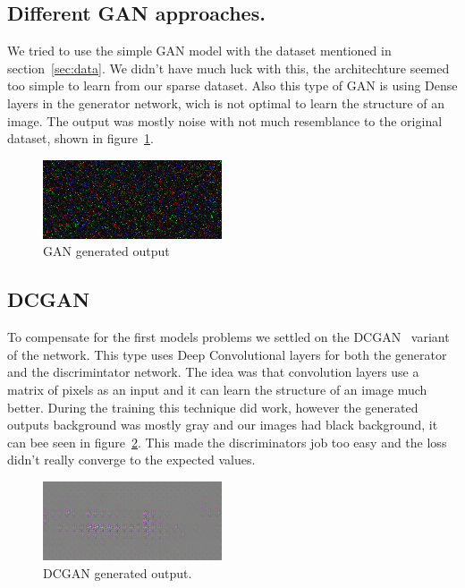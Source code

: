\documentclass{article}
\begin{document}
\subsection{Different GAN approaches.}
We tried to use the simple GAN model with the dataset mentioned in section~\ref{sec:data}. We didn't have much luck with this, the architechture seemed too simple to learn from our sparse dataset. Also this type of GAN is using Dense layers in the generator network, wich is not optimal to learn the structure of an image. The output was mostly noise with not much resemblance to the original dataset, shown in figure~\ref{fig:gan}.
\begin{figure}[!htb]
	\centering
	\includegraphics[width=0.7\linewidth]{gan.png}
	\caption{GAN generated output}
	\label{fig:gan}
\end{figure}
\subsection{DCGAN}
To compensate for the first models problems we settled on the DCGAN~\cite{dcgan} variant of the network. This type uses Deep Convolutional layers for both the generator and the discrimintator network. The idea was that convolution layers use a matrix of pixels as an input and it can learn the structure of an image much better. During the training this technique did work, however the generated outputs background was mostly gray and our images had black background, it can bee seen in figure~\ref{fig:dcgan}. This made the discriminators job too easy and the loss didn't really converge to the expected values.
\begin{figure}[!htb]
	\centering
	\includegraphics[width=0.7\linewidth]{dcgan.png}
	\caption{DCGAN generated output.}
	\label{fig:dcgan}
\end{figure}
\end{document}
